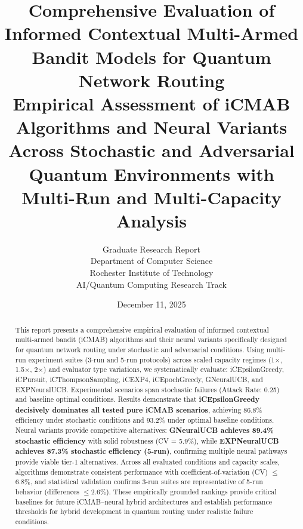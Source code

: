 \documentclass[12pt,a4paper]{article}
\title{\textbf{Comprehensive Evaluation of Informed Contextual Multi-Armed Bandit Models for Quantum Network Routing}\\
\large{Empirical Assessment of iCMAB Algorithms and Neural Variants Across Stochastic and Adversarial Quantum Environments with Multi-Run and Multi-Capacity Analysis}}
\author{Graduate Research Report\\
Department of Computer Science\\
Rochester Institute of Technology\\
AI/Quantum Computing Research Track}
\date{December 11, 2025}
\newcommand{\primarytext}[1]{\textcolor{primaryblue}{\textbf{#1}}}
\newcommand{\legacy}[1]{\textcolor{legacycolor}{\textbf{#1}}}
\newcommand{\neural}[1]{\textcolor{neuralcolor}{\textbf{#1}}}
\begin{document}
\maketitle

\begin{abstract}
This report presents a comprehensive empirical evaluation of informed contextual multi-armed bandit (iCMAB) algorithms and their neural variants specifically designed for quantum network routing under stochastic and adversarial conditions. Using multi-run experiment suites (3-run and 5-run protocols) across scaled capacity regimes (1$\times$, 1.5$\times$, 2$\times$) and evaluator type variations, we systematically evaluate: iCEpsilonGreedy, iCPursuit, iCThompsonSampling, iCEXP4, iCEpochGreedy, GNeuralUCB, and EXPNeuralUCB. Experimental scenarios span stochastic failures (Attack Rate: 0.25) and baseline optimal conditions. Results demonstrate that \primarytext{iCEpsilonGreedy decisively dominates all tested pure iCMAB scenarios}, achieving 86.8\% efficiency under stochastic conditions and 93.2\% under optimal baseline conditions. Neural variants provide competitive alternatives: \neural{GNeuralUCB achieves 89.4\% stochastic efficiency} with solid robustness (CV = 5.9\%), while \legacy{EXPNeuralUCB achieves 87.3\% stochastic efficiency (5-run)}, confirming multiple neural pathways provide viable tier-1 alternatives. Across all evaluated conditions and capacity scales, algorithms demonstrate consistent performance with coefficient-of-variation (CV) $\leq$6.8\%, and statistical validation confirms 3-run suites are representative of 5-run behavior (differences $\leq$2.6\%). These empirically grounded rankings provide critical baselines for future iCMAB--neural hybrid architectures and establish performance thresholds for hybrid development in quantum routing under realistic failure conditions.
\end{abstract}

\newpage
\tableofcontents

\newpage
\end{document}
